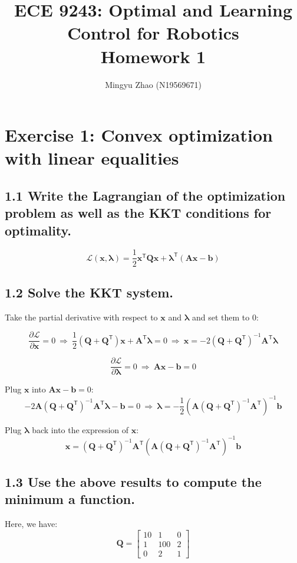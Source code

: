 \documentclass{article}
\title{ECE 9243: Optimal and Learning Control for Robotics \\ Homework 1}
\author{Mingyu Zhao (N19569671)}
\newcommand{\V}[1]{\boldsymbol{#1}}
\begin{document}
\maketitle

\section*{Exercise 1: Convex optimization with linear equalities}

\subsection*{1.1 Write the Lagrangian of the optimization problem as well as the KKT conditions for optimality.}
\[ \mathcal{L}(\V{x}, \V{\lambda}) = \frac{1}{2} \V{x}^{\mathsf{T}} \V{Q} \V{x} + \V{\lambda}^{\mathsf{T}} (\V{A} \V{x} - \V{b}) \]

\subsection*{1.2 Solve the KKT system.}
Take the partial derivative with respect to \( \V{x} \) and \( \V{\lambda} \) and set them to 0:

\[ \frac{\partial \mathcal{L}}{\partial \V{x}} = 0
\ \Rightarrow \ \frac{1}{2} (\V{Q} + \V{Q^\mathsf{T}}) \V{x} + \V{A}^{\mathsf{T}} \V{\lambda} = 0
\ \Rightarrow \ \V{x} = -2 {(\V{Q} + \V{Q^\mathsf{T}})}^{-1} \V{A}^{\mathsf{T}} \V{\lambda} \]

\[ \frac{\partial \mathcal{L}}{\partial \V{\lambda}} = 0
\ \Rightarrow \ \V{A} \V{x} - \V{b} = 0 \]

Plug \( \V{x} \) into \( \V{A} \V{x} - \V{b} = 0 \):
\[ -2 \V{A} {(\V{Q} + \V{Q^\mathsf{T}})}^{-1} \V{A}^{\mathsf{T}} \V{\lambda} - \V{b} = 0
\ \Rightarrow \ \V{\lambda} = - \frac{1}{2} {(\V{A} {(\V{Q} + \V{Q^\mathsf{T}})}^{-1} \V{A}^{\mathsf{T}})} ^{-1} \V{b} \]

Plug \( \V{\lambda} \) back into the expression of \( \V{x} \):
\[ \V{x} = {(\V{Q} + \V{Q^\mathsf{T}})}^{-1} \V{A}^{\mathsf{T}} {(\V{A} {(\V{Q} + \V{Q^\mathsf{T}})}^{-1} \V{A}^{\mathsf{T}})} ^{-1} \V{b} \]

\subsection*{1.3 Use the above results to compute the minimum a function.}
Here, we have:
\[ 
\V{Q} = 
    \begin{bmatrix}
        10 & 1 & 0 \\
        1 & 100 & 2 \\
        0 & 2 & 1 
    \end{bmatrix}
\]
\end{document}
